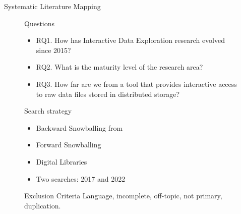 \documentclass[10pt,notes]{beamer}
\begin{document}
\begin{frame}{Systematic Literature Mapping}
\begin{figure}
    \begin{alertblock}{Questions}
        \begin{itemize}
            \item RQ1. How has Interactive Data Exploration research evolved since 2015?
            \item RQ2. What is the maturity level of the research area?
            \item RQ3. How far are we from a tool that provides \alert{interactive} access
                to \alert{raw} data files stored in \alert{distributed} storage?
        \end{itemize}
    \end{alertblock}
    \begin{block}{Search strategy}
        \begin{itemize}
            \item Backward Snowballing from \cite{Idreos2015}
            \item Forward Snowballing
            \item Digital Libraries
            \item Two searches: 2017 and 2022
        \end{itemize}
    \end{block}
    \begin{block}{Exclusion Criteria}
        \smallskip
        Language, incomplete, off-topic, not primary, duplication.
    \end{block}
\end{figure}

\end{frame}
\end{document}
